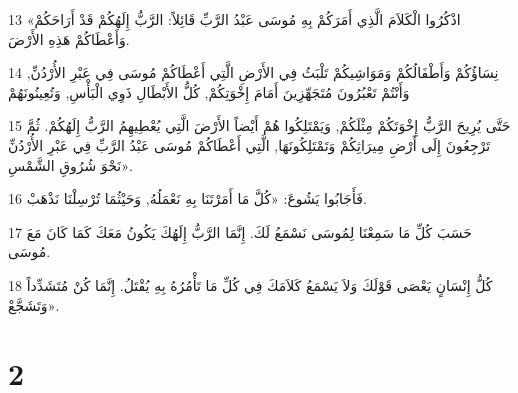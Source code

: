 \par 13 «اذْكُرُوا الْكَلاَمَ الَّذِي أَمَرَكُمْ بِهِ مُوسَى عَبْدُ الرَّبِّ قَائِلاً: الرَّبُّ إِلَهُكُمْ قَدْ أَرَاحَكُمْ وَأَعْطَاكُمْ هَذِهِ الأَرْضَ.
\par 14 نِسَاؤُكُمْ وَأَطْفَالُكُمْ وَمَوَاشِيكُمْ تَلْبَثُ فِي الأَرْضِ الَّتِي أَعْطَاكُمْ مُوسَى فِي عَبْرِ الأُرْدُنِّ, وَأَنْتُمْ تَعْبُرُونَ مُتَجَهِّزِينَ أَمَامَ إِخْوَتِكُمْ, كُلُّ الأَبْطَالِ ذَوِي الْبَأْسِ, وَتُعِينُونَهُمْ
\par 15 حَتَّى يُرِيحَ الرَّبُّ إِخْوَتَكُمْ مِثْلَكُمْ, وَيَمْتَلِكُوا هُمْ أَيْضاً الأَرْضَ الَّتِي يُعْطِيهِمُ الرَّبُّ إِلَهُكُمْ. ثُمَّ تَرْجِعُونَ إِلَى أَرْضِ مِيرَاثِكُمْ وَتَمْتَلِكُونَهَا, الَّتِي أَعْطَاكُمْ مُوسَى عَبْدُ الرَّبِّ فِي عَبْرِ الأُرْدُنِّ نَحْوَ شُرُوقِ الشَّمْسِ».
\par 16 فَأَجَابُوا يَشُوعَ: «كُلَّ مَا أَمَرْتَنَا بِهِ نَعْمَلُهُ, وَحَيْثُمَا تُرْسِلْنَا نَذْهَبْ.
\par 17 حَسَبَ كُلِّ مَا سَمِعْنَا لِمُوسَى نَسْمَعُ لَكَ. إِنَّمَا الرَّبُّ إِلَهُكَ يَكُونُ مَعَكَ كَمَا كَانَ مَعَ مُوسَى.
\par 18 كُلُّ إِنْسَانٍ يَعْصَى قَوْلَكَ وَلاَ يَسْمَعُ كَلاَمَكَ فِي كُلِّ مَا تَأْمُرُهُ بِهِ يُقْتَلُ. إِنَّمَا كُنْ مُتَشَدِّداً وَتَشَجَّعْ».

\chapter{2}

